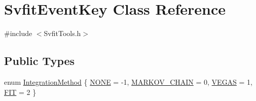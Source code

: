 \hypertarget{classSvfitEventKey}{
\section{SvfitEventKey Class Reference}
\label{classSvfitEventKey}
}


{\ttfamily \#include $<$SvfitTools.h$>$}\subsection*{Public Types}
\begin{DoxyCompactItemize}
\item 
enum \hyperlink{classSvfitEventKey_a88a764b33d83be8b5ac538a980de7b03}{IntegrationMethod} \{ \hyperlink{classSvfitEventKey_a88a764b33d83be8b5ac538a980de7b03a32ab24479e199f867947dd3f89698ef4}{NONE} =  -\/1, 
\hyperlink{classSvfitEventKey_a88a764b33d83be8b5ac538a980de7b03a24e95311937a64e17f8e8094f480cfd5}{MARKOV\_\-CHAIN} =  0, 
\hyperlink{classSvfitEventKey_a88a764b33d83be8b5ac538a980de7b03af2253e6c26956c15a64c53119ef6d18d}{VEGAS} =  1, 
\hyperlink{classSvfitEventKey_a88a764b33d83be8b5ac538a980de7b03a4c54efe8b272371f4c9525db7b10fdbf}{FIT} =  2
 \}
\end{DoxyCompactItemize}
